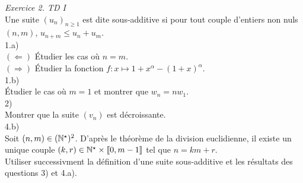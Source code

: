 \emph{Exercice 2. TD I \cite{acamanes}}\\

Une suite $(u_n)_{n\geqslant1}$ est dite sous-additive si pour tout couple d'entiers non nuls $(n, m)$, $u_{n+m} \leqslant u_n + u_m$.\\
1.a)\\ 
\indent $(\Leftarrow)$ Étudier les cas où $n=m$.\\
\indent $(\Rightarrow)$ Étudier la fonction $f:x \mapsto 1+x^{\alpha} - (1+x)^{\alpha}$.\\
1.b)\\
\indent Étudier le cas où $m=1$ et montrer que $w_n = n w_1$.\\
2)\\
\indent Montrer que la suite $(v_n)$ est décroissante.\\ 
4.b)\\
\indent Soit $(n, m) \in (\mathbb{N}^\star)^2$. D'après le théorème de la division euclidienne, il existe un unique couple $(k, r) \in \mathbb{N}^\star \times \llbracket0, m-1 \rrbracket$ tel que $n=km+r$.\\
\indent Utiliser successivment la définition d'une suite sous-additive et les résultats des questions 3) et 4.a).